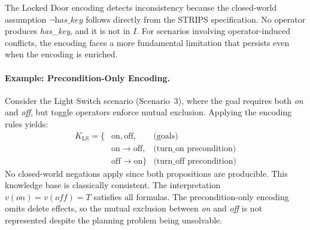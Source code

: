 The Locked Door encoding detects inconsistency because the closed-world assumption $\neg\textit{has\_key}$ follows directly from the \ac{STRIPS} specification. No operator produces \textit{has\_key}, and it is not in $I$. For scenarios involving operator-induced conflicts, the encoding faces a more fundamental limitation that persists even when the encoding is enriched.

\paragraph{Example: Precondition-Only Encoding.} Consider the Light Switch scenario (Scenario~3), where the goal requires both \textit{on} and \textit{off}, but toggle operators enforce mutual exclusion. Applying the encoding rules yields:
\begin{align*}
    K_{\text{LS}} = \{ & \text{on}, \text{off},              & \text{(goals)}                  \\
                       & \text{on} \rightarrow \text{off},   & \text{(turn\_on precondition)}  \\
                       & \text{off} \rightarrow \text{on} \} & \text{(turn\_off precondition)}
\end{align*}
No closed-world negations apply since both propositions are producible. This knowledge base is classically consistent. The interpretation $v(\textit{on}) = v(\textit{off}) = T$ satisfies all formulas. The precondition-only encoding omits delete effects, so the mutual exclusion between \textit{on} and \textit{off} is not represented despite the planning problem being unsolvable.
\pagebreak
